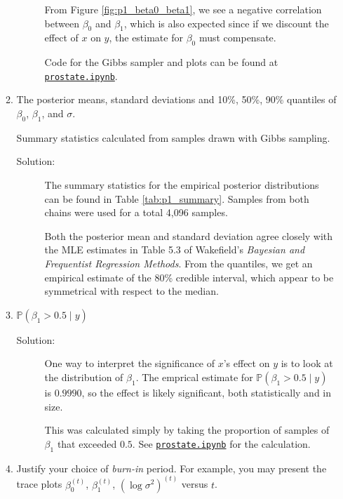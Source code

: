 \documentclass[letterpaper,11pt]{article}
\begin{document}
\begin{enumerate}
\begin{enumerate}
\begin{description}
      From Figure \ref{fig:p1_beta0_beta1}, we see a negative correlation
      between $\beta_0$ and $\beta_1$, which is also expected since if we
      discount the effect of $x$ on $y$, the estimate for $\beta_0$ must
      compensate.
      
      Code for the Gibbs sampler and plots can be found at
      \href{http://nbviewer.jupyter.org/github/ppham27/stat570/blob/master/hw6/prostate.ipynb}{\texttt{prostate.ipynb}}.
    \end{description}
  \item The posterior means, standard deviations and 10\%, 50\%, 90\% quantiles
    of $\beta_0$, $\beta_1$, and $\sigma$.
    
    \begin{table}
      \small
      \centering
      
      \caption{Summary statistics calculated from samples drawn with Gibbs
        sampling.}
      \label{tab:p1_summary}
    \end{table}
    
    \begin{description}
    \item[Solution:] The summary statistics for the empirical posterior
      distributions can be found in Table \ref{tab:p1_summary}. Samples from
      both chains were used for a total 4,096 samples.

      Both the posterior mean and standard deviation agree closely with the MLE
      estimates in Table 5.3 of Wakefield's \emph{Bayesian and Frequentist
        Regression Methods}. From the quantiles, we get an empirical estimate of
      the 80\% credible interval, which appear to be symmetrical with respect to
      the median.
    \end{description}
  \item $\mathbb{P}\left(\beta_1 > 0.5 \mid y\right)$
    \begin{description}
    \item[Solution:] One way to interpret the significance of $x$'s effect on
      $y$ is to look at the distribution of $\beta_1$. The emprical estimate for
      $\mathbb{P}\left(\beta_1 > 0.5 \mid y\right)$ is $\boxed{0.9990}$, so the
      effect is likely significant, both statistically and in size.

      This was calculated simply by taking the proportion of samples of
      $\beta_1$ that exceeded $0.5$. See
      \href{http://nbviewer.jupyter.org/github/ppham27/stat570/blob/master/hw6/prostate.ipynb}{\texttt{prostate.ipynb}}
      for the calculation.
    \end{description}
  \item Justify your choice of \emph{burn-in} period. For example, you may
    present the trace plots $\beta_0^{(t)}$, $\beta_1^{(t)}$,
    $\left(\log\sigma^{2}\right)^{(t)}$ versus $t$.


\end{enumerate}
\end{enumerate}
\end{document}
